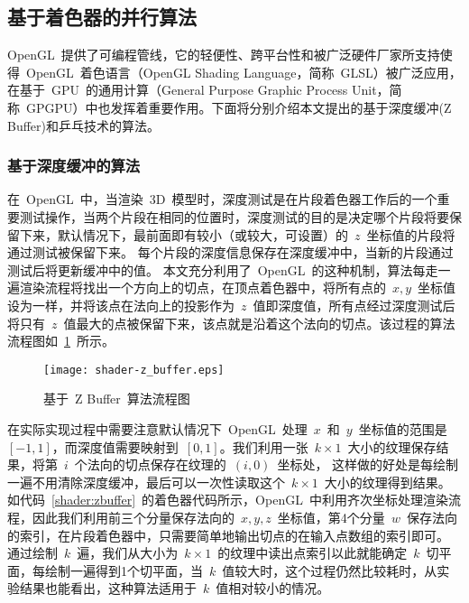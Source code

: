 \subsection{基于着色器的并行算法}
\label{subsec:determ-normals-by-shader}

OpenGL~提供了可编程管线，它的轻便性、跨平台性和被广泛硬件厂家所支持使得~OpenGL~着色语言（OpenGL Shading Language，简称~GLSL）被广泛应用，在基于~GPU~的通用计算（General
Purpose Graphic Process Unit，简称~GPGPU）中也发挥着重要作用。下面将分别介绍本文提出的基于深度缓冲(Z Buffer)和乒乓技术的算法。

\subsubsection{基于深度缓冲的算法}
	
在~OpenGL~中，当渲染~3D~模型时，深度测试是在片段着色器工作后的一个重要测试操作，当两个片段在相同的位置时，深度测试的目的是决定哪个片段将要保留下来，默认情况下，最前面即有较小（或较大，可设置）的~$z$~坐标值的片段将通过测试被保留下来。
每个片段的深度信息保存在深度缓冲中，当新的片段通过测试后将更新缓冲中的值。
本文充分利用了~OpenGL~的这种机制，算法每走一遍渲染流程将找出一个方向上的切点，在顶点着色器中，将所有点的~$x,y$~坐标值设为一样，并将该点在法向上的投影作为~$z$~值即深度值，所有点经过深度测试后将只有~$z$~值最大的点被保留下来，该点就是沿着这个法向的切点。该过程的算法流程图如~\ref{fig:flowchart:zbuffer}~所示。

\begin{figure}[htbp]
  \centering
  \texttt{[image: shader-z\_buffer.eps]}
  \caption{基于~Z Buffer~算法流程图}
  \label{fig:flowchart:zbuffer}
\end{figure}

在实际实现过程中需要注意默认情况下~OpenGL~处理~$x$~和~$y$~坐标值的范围是~$[-1,1]$，而深度值需要映射到~$[0,1]$。我们利用一张~$k \times 1$~大小的纹理保存结果，将第~$i$~个法向的切点保存在纹理的~$(i,0)$~坐标处，
这样做的好处是每绘制一遍不用清除深度缓冲，最后可以一次性读取这个~$k \times 1$~大小的纹理得到结果。
如代码~\ref{shader:zbuffer}~的着色器代码所示，OpenGL~中利用齐次坐标处理渲染流程，因此我们利用前三个分量保存法向的~$x,y,z$~坐标值，第4个分量~$w$~保存法向的索引，在片段着色器中，只需要简单地输出切点的在输入点数组的索引即可。
通过绘制~$k$~遍，我们从大小为~$k \times 1$~的纹理中读出点索引以此就能确定~$k$~切平面，每绘制一遍得到1个切平面，当~$k$~值较大时，这个过程仍然比较耗时，从实验结果也能看出，这种算法适用于~$k$~值相对较小的情况。
%


